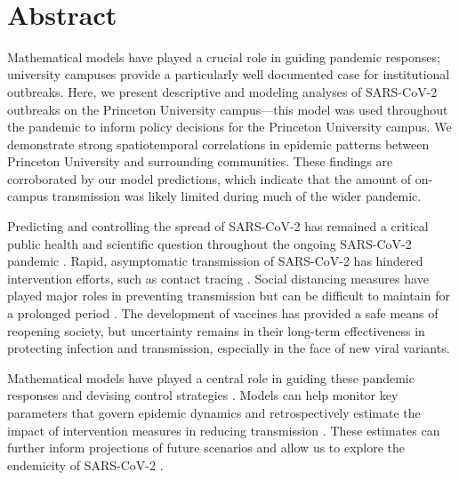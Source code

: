 \documentclass[12pt]{article}
\date{\today}
\begin{document}
\begin{flushleft}{
	\Large
	\textbf{}
}
\newline
\\ 
\end{flushleft}

\section*{Abstract}

Mathematical models have played a crucial role in guiding pandemic responses; university campuses provide a particularly well documented case for institutional outbreaks.
Here, we present descriptive and modeling analyses of SARS-CoV-2 outbreaks on the Princeton University campus---this model was used throughout the pandemic to inform policy decisions for the Princeton University campus.
We demonstrate strong spatiotemporal correlations in epidemic patterns between Princeton University and surrounding communities.
These findings are corroborated by our model predictions, which indicate that the amount of on-campus transmission was likely limited during much of the wider pandemic.

\pagebreak

Predicting and controlling the spread of SARS-CoV-2 has remained a critical public health and scientific question throughout the ongoing SARS-CoV-2 pandemic \citep{baker2021limits}.
Rapid, asymptomatic transmission of SARS-CoV-2 has hindered intervention efforts, such as contact tracing \citep{hellewell2020feasibility}.
Social distancing measures have played major roles in preventing transmission but can be difficult to maintain for a prolonged period \citep{galanti2021social}.
The development of vaccines has provided a safe means of reopening society, but uncertainty remains in their long-term effectiveness in protecting infection and transmission, especially in the face of new viral variants.

Mathematical models have played a central role in guiding these pandemic responses and devising control strategies \citep{metcalf2020mathematical}.
Models can help monitor key parameters that govern epidemic dynamics \citep{kraemer2021monitoring} and retrospectively estimate the impact of intervention measures in reducing transmission \citep{flaxman2020estimating}.
These estimates can further inform projections of future scenarios and allow us to explore the endemicity of SARS-CoV-2 \citep{kissler2020projecting,saad2020immune,lavine2021immunological,saad2021epidemiological}.
\end{document}

